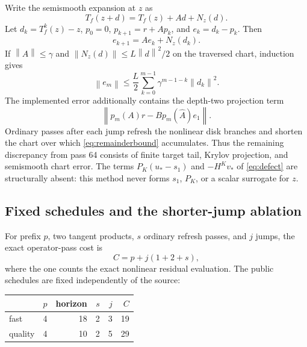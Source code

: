 \documentclass[10pt,twocolumn]{article}
\theoremstyle{definition}\newtheorem{remark}[proposition]{Remark}
\newcommand{\norm}[1]{\left\lVert#1\right\rVert}
\newcommand{\Tf}{T_f}
\begin{document}
Write the semismooth expansion at $z$ as
\begin{equation}
\Tf(z+d)=\Tf(z)+Ad+N_z(d).
\end{equation}
Let $d_k=\Tf^k(z)-z$, $p_0=0$, $p_{k+1}=r+Ap_k$, and
$e_k=d_k-p_k$.  Then
\begin{equation}
e_{k+1}=Ae_k+N_z(d_k).
\end{equation}
If $\norm A\le\gamma$ and $\norm{N_z(d)}\le L\norm d^2/2$ on the traversed
chart, induction gives
\begin{equation}
\norm{e_m}\le \frac{L}{2}\sum_{k=0}^{m-1}
\gamma^{m-1-k}\norm{d_k}^2.
\label{eq:remainderbound}
\end{equation}
The implemented error additionally contains the depth-two projection term
\begin{equation}
\norm{p_m(A)r-Bp_m(\widehat A)e_1}.
\end{equation}
Ordinary passes after each jump refresh the nonlinear disk branches and
shorten the chart over which \eqref{eq:remainderbound} accumulates.  Thus the
remaining discrepancy from pass 64 consists of finite target tail, Krylov
projection, and semismooth chart error.  The terms $P_K(u_*-s_1)$ and
$-H^Kv_*$ of \eqref{eq:defect} are structurally absent: this method never
forms $s_1$, $P_K$, or a scalar surrogate for $z$.

\subsection{Fixed schedules and the shorter-jump ablation}

For prefix $p$, two tangent products, $s$ ordinary refresh passes, and $j$
jumps, the exact operator-pass cost is
\begin{equation}
C=p+j(1+2+s),
\label{eq:cost}
\end{equation}
where the one counts the exact nonlinear residual evaluation.  The public
schedules are fixed independently of the source:
\begin{center}\small
\begin{tabular}{lrrrrr}\toprule
&$p$& horizon &$s$&$j$&$C$\\\midrule
fast&4&18&2&3&19\\
quality&4&10&2&5&29\\\bottomrule
\end{tabular}
\end{center}
\end{document}
